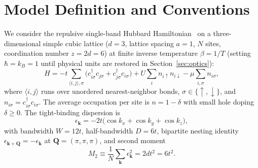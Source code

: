 \documentclass[11pt,a4paper]{article}
\numberwithin{equation}{section}
\theoremstyle{plain}
\theoremstyle{definition}
\providecommand{\vk}{\mathbf{k}}
\providecommand{\vQ}{\mathbf{Q}}
\begin{document}
\begin{abstract}
$O_h$ $E_g$ ($d$-wave) ordered-phase solvers; (3)~a deterministic Track~IV-B
symmetry-sector Lehmann exact-diagonalization solver with Rank-6 SVD local vertices
and multi-line $\Gamma_c^{\mathrm{irr}}$ divergence detection ($N_{\mathrm{div}} = 0 \to 10$);
(4)~self-consistent three-particle $\gamma^{(6)}$ spin-polaron and two-magnon
contractions in the deep-Mott ($U \gg W$, small $\delta$) regime; and (5)~an
$M = 1,2,3$ multi-orbital Kanamori ($U, U', J_H, \Delta_{\mathrm{cf}}$) orbital-matrix
dual-fermion solver benchmarked on $\mathrm{V}_2\mathrm{O}_3$ Hund's-metal, orbital-selective
Mott, and $R\mathrm{NiO}_3$ crystal-field oxide proxies.
\end{abstract}

\tableofcontents
\vspace{1em}

\section{Model Definition and Conventions}
\label{sec:model}

We consider the repulsive single-band Hubbard Hamiltonian~\cite{Georges1996,Rohringer2018} on a three-dimensional simple
cubic lattice ($d = 3$, lattice spacing $a = 1$, $N$ sites, coordination number
$z = 2d = 6$) at finite inverse temperature $\beta = 1/T$ (setting $\hbar = k_B = 1$
until physical units are restored in Section~\ref{sec:optics}):
\begin{equation}
    H = -t \sum_{\langle i,j\rangle,\sigma}
        \bigl( c^\dagger_{i\sigma} c_{j\sigma} + c^\dagger_{j\sigma} c_{i\sigma} \bigr)
        + U \sum_{i} n_{i\uparrow} n_{i\downarrow}
        - \mu \sum_{i,\sigma} n_{i\sigma},
    \label{eq:hubbard}
\end{equation}
where $\langle i,j\rangle$ runs over unordered nearest-neighbor bonds,
$\sigma \in \{\uparrow,\downarrow\}$, and $n_{i\sigma} = c^\dagger_{i\sigma} c_{i\sigma}$.
The average occupation per site is $n = 1 - \delta$ with small hole doping $\delta \ge 0$.
The tight-binding dispersion is
\begin{equation}
    \epsilon_{\vk} = -2t \bigl( \cos k_x + \cos k_y + \cos k_z \bigr),
    \label{eq:dispersion}
\end{equation}
with bandwidth $W = 12t$, half-bandwidth $D = 6t$, bipartite nesting identity
$\epsilon_{\vk+\vQ} = -\epsilon_{\vk}$ at $\vQ = (\pi,\pi,\pi)$, and second moment
\begin{equation}
    M_2 \equiv \frac{1}{N} \sum_{\vk} \epsilon_{\vk}^2 = 2 d t^2 = 6 t^2.
    \label{eq:M2}
\end{equation}
\end{document}

